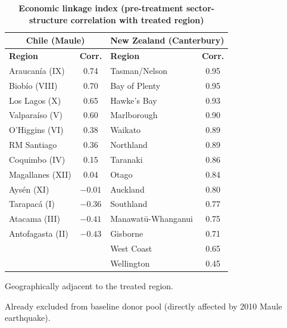 \documentclass[12pt]{article}
\begin{document}
\begin{table}[H]
\centering
\caption{\textbf{Economic linkage index (pre-treatment sector-structure correlation with treated region)}}
\label{tab:economic_linkage}
\small
\setlength{\tabcolsep}{5pt}
\begin{threeparttable}
\begin{tabular}{lc|lc}
\toprule
\multicolumn{2}{c|}{\textbf{Chile (Maule)}} & \multicolumn{2}{c}{\textbf{New Zealand (Canterbury)}} \\
\midrule
\textbf{Region} & \textbf{Corr.} & \textbf{Region} & \textbf{Corr.} \\
\midrule
Araucanía (IX)\tnote{a}           & 0.74 & Tasman/Nelson            & 0.95 \\
Biobío (VIII)\tnote{b}            & 0.70 & Bay of Plenty            & 0.95 \\
Los Lagos (X)              & 0.65 & Hawke's Bay              & 0.93 \\
Valparaíso (V)             & 0.60 & Marlborough\tnote{a}     & 0.90 \\
O'Higgins (VI)\tnote{a}   & 0.38 & Waikato                  & 0.89 \\
RM Santiago                & 0.36 & Northland                & 0.89 \\
Coquimbo (IV)              & 0.15 & Taranaki                 & 0.86 \\
Magallanes (XII)           & 0.04 & Otago\tnote{a}           & 0.84 \\
Aysén (XI)                 & $-0.01$ & Auckland              & 0.80 \\
Tarapacá (I)               & $-0.36$ & Southland              & 0.77 \\
Atacama (III)              & $-0.41$ & Manawatū-Whanganui     & 0.75 \\
Antofagasta (II)           & $-0.43$ & Gisborne               & 0.71 \\
                           &      & West Coast\tnote{a}      & 0.65 \\
                           &      & Wellington               & 0.45 \\
\bottomrule
\end{tabular}
\begin{tablenotes}[flushleft]\footnotesize
\item[a] Geographically adjacent to the treated region.
\item[b] Already excluded from baseline donor pool (directly affected by 2010 Maule earthquake).
\end{tablenotes}
\end{threeparttable}
\end{table}
\end{document}

